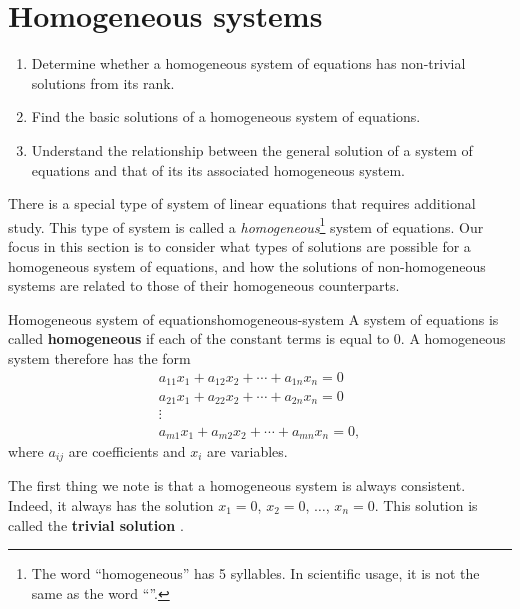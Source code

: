 \section{Homogeneous systems}
\label{sec:homogeneous-systems}

\begin{outcome}
  \begin{enumerate}
  \item Determine whether a homogeneous system of equations has
    non-trivial solutions from its rank.
  \item Find the basic solutions of a homogeneous system of
    equations.
  \item Understand the relationship between the general solution of a
    system of equations and that of its its associated homogeneous
    system.
  \end{enumerate}
\end{outcome}

There is a special type of system of linear equations that requires
additional study. This type of system is called a {\em
  homogeneous}\footnote{The word ``homogeneous'' has 5 syllables. In
  scientific usage, it is not the same as the word
  ``\nospellcheck{\homogenous}''.}  system of equations.  Our focus in
this section is to consider what types of solutions are possible for a
homogeneous system of equations, and how the solutions of
non-homogeneous systems are related to those of their homogeneous
counterparts.

\begin{definition}{Homogeneous system of equations}{homogeneous-system}
  A system of equations is called
  \textbf{homogeneous}%
  if each of the constant terms is equal to $0$. A homogeneous system
  therefore has the form
\begin{equation*}
\begin{array}{c}
a_{11}x_{1}+a_{12}x_{2}+\cdots +a_{1n}x_{n}= 0 \\
a_{21}x_{1}+a_{22}x_{2}+\cdots +a_{2n}x_{n}= 0  \\
\vdots \\
a_{m1}x_{1}+a_{m2}x_{2}+\cdots +a_{mn}x_{n}= 0, 
\end{array}
\end{equation*}
where $a_{ij}$ are coefficients and $x_{i}$ are variables.
\end{definition}

The first thing we note is that a homogeneous system is always
consistent. Indeed, it always has the solution $x_1=0$, $x_2=0$, $\ldots$,
$x_n=0$. This solution is called the
\textbf{trivial solution}%
%
.

